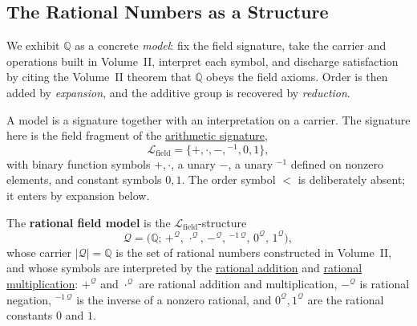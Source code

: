 \subsection*{The Rational Numbers as a Structure}

\begin{remark*}
We exhibit $\mathbb{Q}$ as a concrete \emph{model}: fix the field signature,
take the carrier and operations built in Volume~II, interpret each symbol, and
discharge satisfaction by citing the Volume~II theorem that $\mathbb{Q}$ obeys
the field axioms. Order is then added by \emph{expansion}, and the additive
group is recovered by \emph{reduction}.
\end{remark*}

\begin{remark*}[Exposition]
A model is a signature together with an interpretation on a carrier. The
signature here is the field fragment of the
\hyperref[def:arithmetic-signature]{arithmetic signature},
\[
\mathcal{L}_{\mathrm{field}}=\{+,\cdot,-,{}^{-1},0,1\},
\]
with binary function symbols $+,\cdot$, a unary $-$, a unary ${}^{-1}$ defined on
nonzero elements, and constant symbols $0,1$. The order symbol $<$ is
deliberately absent; it enters by expansion below.
\end{remark*}

\begin{definition}
\label{def:rational-field-model}
The \textbf{rational field model} is the $\mathcal{L}_{\mathrm{field}}$-structure
\[
\mathcal{Q}=\bigl(\mathbb{Q};\,
+^{\mathcal{Q}},\,\cdot^{\mathcal{Q}},\,-^{\mathcal{Q}},\,{}^{-1\,\mathcal{Q}},\,
0^{\mathcal{Q}},\,1^{\mathcal{Q}}\bigr),
\]
whose carrier $|\mathcal{Q}|=\mathbb{Q}$ is the set of rational numbers
constructed in Volume~II, and whose symbols are interpreted by the
\hyperref[def:addition-on-q-classes]{rational addition} and
\hyperref[def:multiplication-on-q-classes]{rational multiplication}: $+^{\mathcal{Q}}$ and
$\cdot^{\mathcal{Q}}$ are rational addition and multiplication, $-^{\mathcal{Q}}$
is rational negation, ${}^{-1\,\mathcal{Q}}$ is the inverse of a nonzero
rational, and $0^{\mathcal{Q}},1^{\mathcal{Q}}$ are the rational constants
$0$ and $1$.
\end{definition}

